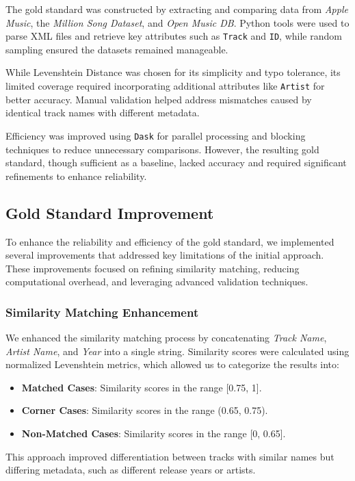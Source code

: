 \documentclass[runningheads]{llncs}
\begin{document}
The gold standard was constructed by extracting and comparing data from \textit{Apple Music}, the \textit{Million Song Dataset}, and \textit{Open Music DB}. Python tools were used to parse XML files and retrieve key attributes such as \texttt{Track} and \texttt{ID}, while random sampling ensured the datasets remained manageable.

While Levenshtein Distance was chosen for its simplicity and typo tolerance, its limited coverage required incorporating additional attributes like \texttt{Artist} for better accuracy. Manual validation helped address mismatches caused by identical track names with different metadata.

Efficiency was improved using \texttt{Dask} for parallel processing and blocking techniques to reduce unnecessary comparisons. However, the resulting gold standard, though sufficient as a baseline, lacked accuracy and required significant refinements to enhance reliability.

\subsection{Gold Standard Improvement}

To enhance the reliability and efficiency of the gold standard, we implemented several improvements that addressed key limitations of the initial approach. These improvements focused on refining similarity matching, reducing computational overhead, and leveraging advanced validation techniques.

\subsubsection*{Similarity Matching Enhancement}
We enhanced the similarity matching process by concatenating \textit{Track Name}, \textit{Artist Name}, and \textit{Year} into a single string. Similarity scores were calculated using normalized Levenshtein metrics, which allowed us to categorize the results into:
\begin{itemize}
    \item \textbf{Matched Cases}: Similarity scores in the range [0.75, 1].
    \item \textbf{Corner Cases}: Similarity scores in the range (0.65, 0.75).
    \item \textbf{Non-Matched Cases}: Similarity scores in the range [0, 0.65].
\end{itemize}

This approach improved differentiation between tracks with similar names but differing metadata, such as different release years or artists.
\end{document}
